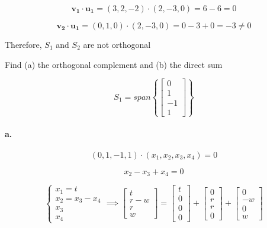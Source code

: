 \documentclass{report}
\begin{document}
$$
\bm{v_1} \cdot \bm{u_1}  =(3,2,-2) \cdot (2, -3, 0) = 6 - 6 = 0
$$

$$
\bm{v_2} \cdot \bm{u_1} = (0,1,0) \cdot (2,-3,0) = 0 - 3 + 0 = -3 \ne 0
$$

Therefore, $S_1$ and $S_2$ are not orthogonal\\

\begin{tcolorbox}[colframe = lightred]
	Find (a) the orthogonal complement and (b) the direct sum
	
	$$
	S_1 = span \left\{ \begin{bmatrix} 0 \\ 1 \\ -1  \\ 1 \end{bmatrix} \right\}
	$$
\end{tcolorbox}

\paragraph{a.}

$$
(0,1, -1,1) \cdot (x_1, x_2, x_3, x_4) = 0 
$$

$$
x_2 - x_3 + x_4 = 0  
$$

$$
\begin{cases}
	x_1 = t \\ x_2 = x_3 - x_4 \\ x_3 \\ x_4 
\end{cases}
\implies \begin{bmatrix}	t \\ r - w\\ r \\ w \end{bmatrix} = \begin{bmatrix} t \\ 0 \\ 0 \\ 0 \end{bmatrix} + \begin{bmatrix} 0 \\ r \\ r \\ 0 \end{bmatrix} + \begin{bmatrix} 0 \\ -w \\ 0 \\ w \end{bmatrix}
$$
\end{document}
